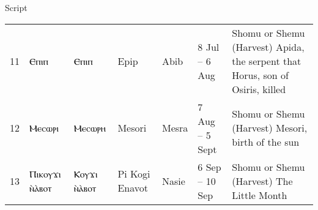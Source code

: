 \begin{table}[p]
\begin{scriptexample}[\pan]{Script}
{\begin{tabular}{l >{\pan}p{1.3cm} >{\pan\raggedright }p{1.3cm} >{\raggedright}p{1.3cm} l l >{\RaggedRight}p{3cm}}
11	&Ⲉⲡⲓⲡ	 &Ⲉⲡⲓⲡ	  &Epip	&Abib	&8 Jul – 6 Aug	&Shomu or Shemu (Harvest)	Apida, the serpent that Horus, son of Osiris, killed\\

12	&Ⲙⲉⲥⲱⲣⲓ	&Ⲙⲉⲥⲱⲣⲏ	&Mesori	&Mesra	 &7 Aug – 5 Sept	&Shomu or Shemu (Harvest)	Mesori, birth of the sun\\

13	&Ⲡⲓⲕⲟⲩϫⲓ  ⲛ̀ⲁ̀ⲃⲟⲧ	&Ⲕⲟⲩϫⲓ  ⲛ̀ⲁ̀ⲃⲟⲧ	 &Pi Kogi Enavot	&Nasie	&6 Sep – 10 Sep &	Shomu or Shemu (Harvest)	The Little Month  \\                

\bottomrule    
\end{tabular}

}
\vspace*{3cm}
\end{scriptexample}

\end{table}









                  
                  
                  
                  